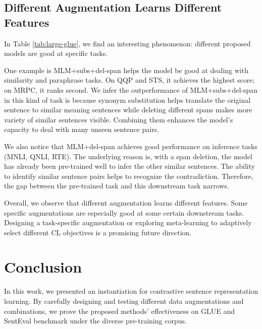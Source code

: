 \documentclass[11pt,a4paper]{article}
\begin{document}
\subsection{Different Augmentation Learns Different Features} \label{5_2}
In Table \ref{tab:large-glue}, we find an interesting phenomenon: different proposed models are good at specific tasks.

One example is MLM+subs+del-span helps the model be good at dealing with similarity and paraphrase tasks. On QQP and STS, it achieves the highest score; on MRPC, it ranks second. We infer the outperformance of MLM+subs+del-span in this kind of task is because synonym substitution helps translate the original sentence to similar meaning sentences while deleting different spans makes more variety of similar sentences visible. Combining them enhances the model's capacity to deal with many unseen sentence pairs. 

We also notice that MLM+del-span achieves good performance on inference tasks (MNLI, QNLI, RTE). The underlying reason is, with a span deletion, the model has already been pre-trained well to infer the other similar sentences.
The ability to identify similar sentence pairs helps to recognize the contradiction. 
Therefore, the gap between the pre-trained task and this downstream task narrows.

Overall, we observe that different augmentation learns different features. Some specific augmentations are especially good at some certain downstream tasks. Designing a task-specific augmentation or exploring meta-learning to adaptively select different CL objectives is a promising future direction. 
 \section{Conclusion} \label{conclusion}
In this work, we presented an instantiation for contrastive sentence representation learning. By carefully designing and testing different data augmentations and combinations, we prove the proposed methods' effectiveness on GLUE and SentEval benchmark under the diverse pre-training corpus. 
\end{document}
